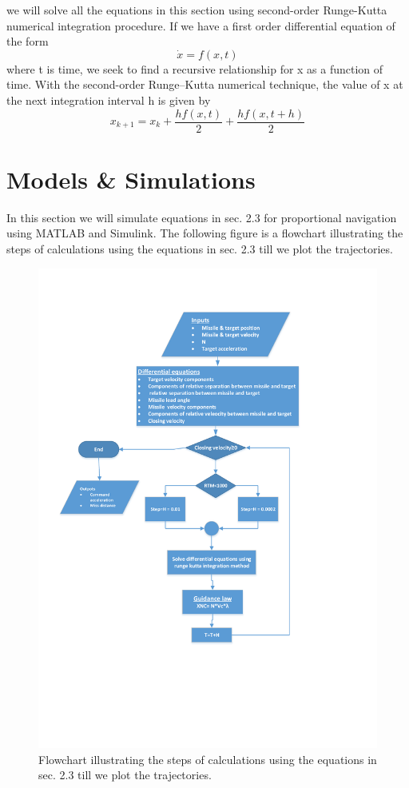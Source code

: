 we will solve all the equations in this section using second-order Runge-Kutta numerical integration procedure. If we have a first order differential equation of the form 
\begin{equation*}
	\dot{x} = f(x,t) 
\end{equation*} 
 where t is time, we seek to find a recursive relationship for x as a function of time.
 With the second-order Runge–Kutta numerical technique, the value of x at the
 next integration interval h is given by
 \begin{equation*}
 	x_{k+1} = x_k + \dfrac{hf(x,t)}{2} + \dfrac{h f(x, t+h)}{2}
 \end{equation*}
\section{Models \& Simulations}

In this section we will simulate equations in sec. 2.3 for proportional navigation using MATLAB and Simulink.
The following figure is a flowchart illustrating the steps of calculations using the equations in sec. 2.3  till we plot the trajectories.

\begin{figure}[H]
	\centering
	\includegraphics[scale = 0.65]{fig/FlowchartPN.pdf}
	\caption{Flowchart illustrating the steps of calculations using the equations in sec. 2.3  till we plot the trajectories.}
	\label{flowchart PN}
\end{figure}



